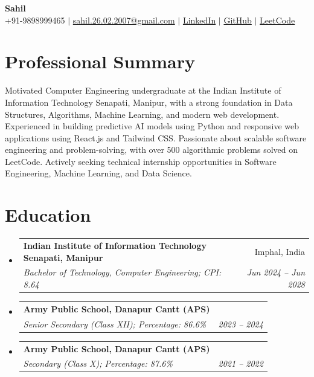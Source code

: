 \documentclass[11pt,a4paper]{article}
\makeatletter
\newcommand{\resumeSubheading}[4]{
    \begin{tabular*}{1\textwidth}[t]{l@{\extracolsep{\fill}}r}
      \textbf{#1} & #2 \\
      \textit{#3} & \textit{#4} \\
    \end{tabular*}\vspace{-4pt}
}
\makeatother
\begin{document}
\begin{center}
    {\Huge \textbf{Sahil}} \\ \vspace{4pt}
    \small 
    +91-9898999465 $|$ \href{mailto:sahil.26.02.2007@gmail.com}{\color{black}sahil.26.02.2007@gmail.com} $|$ 
    \href{https://www.linkedin.com/in/sahil-b870593a4}{\color{black}LinkedIn} $|$ 
    \href{https://github.com/Sahil-2526}{\color{black}GitHub} $|$ 
    \href{https://leetcode.com/u/Sahil-2526/}{\color{black}LeetCode}
\end{center}

\section{Professional Summary}
\vspace{2pt}
\small{Motivated Computer Engineering undergraduate at the Indian Institute of Information Technology Senapati, Manipur, with a strong foundation in Data Structures, Algorithms, Machine Learning, and modern web development. Experienced in building predictive AI models using Python and responsive web applications using React.js and Tailwind CSS. Passionate about scalable software engineering and problem-solving, with over 500 algorithmic problems solved on LeetCode. Actively seeking technical internship opportunities in Software Engineering, Machine Learning, and Data Science.}

\section{Education}
\begin{itemize}[leftmargin=0in, label={}, itemsep=2pt]
  \item \resumeSubheading
    {Indian Institute of Information Technology Senapati, Manipur}{Imphal, India}
    {Bachelor of Technology, Computer Engineering; CPI: 8.64}{Jun 2024 -- Jun 2028}
  \item \resumeSubheading
    {Army Public School, Danapur Cantt (APS)}{}
    {Senior Secondary (Class XII); Percentage: 86.6\%}{2023 -- 2024}
  \item \resumeSubheading
    {Army Public School, Danapur Cantt (APS)}{}
    {Secondary (Class X); Percentage: 87.6\%}{2021 -- 2022}
\end{itemize}

\end{document}
